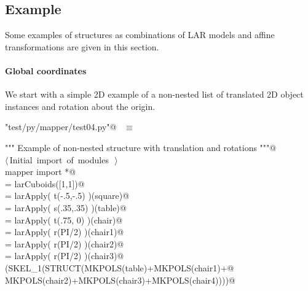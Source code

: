 \documentclass[11pt,oneside]{article}	%
\begin{document}
\subsection{Example}
Some examples of structures as combinations of LAR models and affine transformations are given in this section. 

\paragraph{Global coordinates}
We start with a simple 2D example of a non-nested list of translated 2D object instances and rotation about the origin.

\begin{flushleft} \small \label{scrap38}
\verb@"test/py/mapper/test04.py"@\nobreak\ {\footnotesize {} }$\equiv$
\vspace{-1ex}
\begin{list}{}{} \item
\mbox{}\verb@""" Example of non-nested structure with translation and rotations """@\\
\mbox{}\verb@@\hbox{$\langle\,$Initial import of modules\nobreak\ {\footnotesize {}}$\,\rangle$}\verb@@\\
\mbox{}\verb@from mapper import *@\\
\mbox{}\verb@square = larCuboids([1,1])@\\
\mbox{}\verb@table = larApply( t(-.5,-.5) )(square)@\\
\mbox{}\verb@chair = larApply( s(.35,.35) )(table)@\\
\mbox{} = larApply( t(.75, 0) )(chair)@\\
\mbox{} = larApply( r(PI/2) )(chair1)@\\
\mbox{} = larApply( r(PI/2) )(chair2)@\\
\mbox{} = larApply( r(PI/2) )(chair3)@\\
\mbox{}\verb@VIEW(SKEL_1(STRUCT(MKPOLS(table)+MKPOLS(chair1)+@\\
\mbox{}\verb@               MKPOLS(chair2)+MKPOLS(chair3)+MKPOLS(chair4))))@\\
\mbox{}\verb@@{\NWsep}
\end{list}
\vspace{-2ex}
\end{flushleft}
\end{document}

